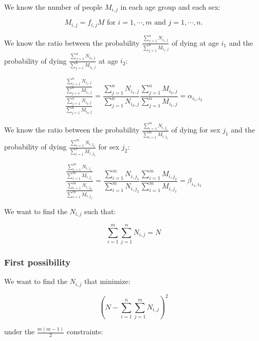 We know the number of people $M_{i,j}$ in each age group and each sex:

\begin{equation*}
M_{i,j} = f_{i,j} M \text{ for } i = 1 , \cdots , m \text{ and } j = 1 , \cdots , n.
\end{equation*}

We know the ratio between the probability $\frac{\sum_{j = 1}^n N_{i_1,j}}{\sum_{j = 1}^n M_{i_1,j}}$ of dying at age $i_1$ and the probability of dying $\frac{\sum_{j = 1}^n N_{i_2,j}}{\sum_{j = 1}^n M_{i_2,j}}$ at age $i_2$:

\begin{equation*}
\frac{\frac{\sum_{j = 1}^n N_{i_1,j}}{\sum_{j = 1}^n M_{i_1,j}}}{\frac{\sum_{j = 1}^n N_{i_2,j}}{\sum_{j = 1}^n M_{i_2,j}}} = \frac{\sum_{j = 1}^n N_{i_1,j}}{\sum_{j = 1}^n N_{i_2,j}} \frac{\sum_{j = 1}^n M_{i_2,j}}{\sum_{j = 1}^n M_{i_1,j}} = \alpha_{i_1,i_2}
\end{equation*}

We know the ratio between the probability $\frac{\sum_{i = 1}^m N_{i,j_1}}{\sum_{i = 1}^m M_{i,j_1}}$ of dying for sex $j_1$ and the probability of dying $\frac{\sum_{i = 1}^m N_{i,j_2}}{\sum_{i = 1}^n M_{i,j_2}}$ for sex $j_2$:

\begin{equation*}
\frac{\frac{\sum_{i = 1}^m N_{i,j_1}}{\sum_{i = 1}^m M_{i,j_1}}}{\frac{\sum_{i = 1}^m N_{i,j_2}}{\sum_{i = 1}^m M_{i,j_2}}} = \frac{\sum_{i = 1}^m N_{i,j_1}}{\sum_{i = 1}^m N_{i,j_2}} \frac{\sum_{i = 1}^m M_{i,j_2}}{\sum_{i = 1}^m M_{i,j_1}} = \beta_{i_1,i_2}
\end{equation*}

We want to find the $N_{i,j}$ such that:

\begin{equation*}
\sum_{i = 1}^m \sum_{j = 1}^n N_{i,j} = N
\end{equation*}

\subsubsection{First possibility}

We want to find the $N_{i,j}$ that minimize:

\begin{equation*}
\left( N - \sum_{i = 1}^n \sum_{j = 1}^m N_{i,j} \right) ^2
\end{equation*}

under the $\frac{m \left( m - 1\right)}{2}$ constraints:

